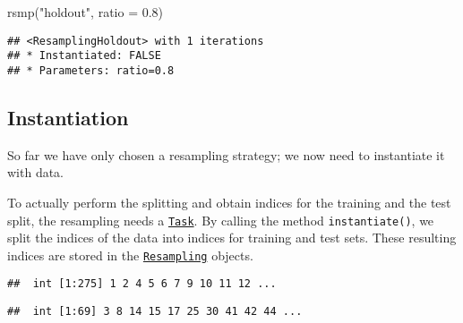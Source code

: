 \documentclass[
]{scrbook}
\newenvironment{Shaded}{\begin{snugshade}}{\end{snugshade}}
\newcommand{\AttributeTok}[1]{\textcolor[rgb]{0.77,0.63,0.00}{#1}}
\newcommand{\DecValTok}[1]{\textcolor[rgb]{0.00,0.00,0.81}{#1}}
\newcommand{\FloatTok}[1]{\textcolor[rgb]{0.00,0.00,0.81}{#1}}
\newcommand{\FunctionTok}[1]{\textcolor[rgb]{0.00,0.00,0.00}{#1}}
\newcommand{\NormalTok}[1]{#1}
\newcommand{\SpecialCharTok}[1]{\textcolor[rgb]{0.00,0.00,0.00}{#1}}
\newcommand{\StringTok}[1]{\textcolor[rgb]{0.31,0.60,0.02}{#1}}
\renewenvironment{Shaded} {\begin{snugshade}\small} {\end{snugshade}}
\begin{document}
\begin{Shaded}
\begin{Highlighting}[]
\FunctionTok{rsmp}\NormalTok{(}\StringTok{"holdout"}\NormalTok{, }\AttributeTok{ratio =} \FloatTok{0.8}\NormalTok{)}
\end{Highlighting}
\end{Shaded}

\begin{verbatim}
## <ResamplingHoldout> with 1 iterations
## * Instantiated: FALSE
## * Parameters: ratio=0.8
\end{verbatim}

\hypertarget{resampling-inst}{%
\subsection{Instantiation}\label{resampling-inst}}

So far we have only chosen a resampling strategy; we now need to instantiate it with data.

To actually perform the splitting and obtain indices for the training and the test split, the resampling needs a \href{https://mlr3.mlr-org.com/reference/Task.html}{\texttt{Task}}.
By calling the method \texttt{instantiate()}, we split the indices of the data into indices for training and test sets.
These resulting indices are stored in the \href{https://mlr3.mlr-org.com/reference/Resampling.html}{\texttt{Resampling}} objects.

\begin{Shaded}
\end{Shaded}

\begin{verbatim}
##  int [1:275] 1 2 4 5 6 7 9 10 11 12 ...
\end{verbatim}

\begin{Shaded}
\end{Shaded}

\begin{verbatim}
##  int [1:69] 3 8 14 15 17 25 30 41 42 44 ...
\end{verbatim}
\end{document}
